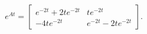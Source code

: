 \documentclass[11pt]{article}
\newenvironment{SL}[1][Solution]{\begin{trivlist}
\item[{\color{blue} \hskip \labelsep {\bfseries #1:}}]}{\end{trivlist}}
\begin{document}
\begin{SL} \
$$
e^{At} = 
\begin{bmatrix}
   e^{-2t} + 2te^{-2t} & te^{-2t} \\
-4te^{-2t}             & e^{-2t}-2te^{-2t} 
\end{bmatrix}.
$$
\end{SL}

\end{document}
